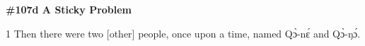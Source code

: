 
\textbf{\#107d A Sticky Problem }

1 Then there were two [other] people, once upon a time, named Qɔ̀-nɛ́ and Qɔ̀-ŋɔ́.

